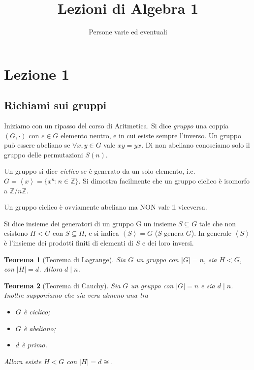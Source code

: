 \documentclass[a4paper,10pt,oneside]{article}
\title{Lezioni di Algebra 1}
\author{Persone varie ed eventuali}
\date{}
\newcommand{\myname}[1]{\emph{#1}}
\newcommand{\abs}[1]{\left|#1\right|} %
\newcommand{\gen}[1]{\left\langle#1\right\rangle} %
\newcommand{\isom}{\cong}
\theoremstyle{plain}
\newtheorem{mytheorem}{Teorema}[section]
\theoremstyle{definition}
\theoremstyle{remark}
\begin{document}
\maketitle

\cleardoublepage	
  \section{Lezione 1}
    \subsection{Richiami sui gruppi}
      Iniziamo con un ripasso del corso di Aritmetica. Si dice \myname{gruppo} una coppia $(G,\cdot)$ con $e \in G$ elemento neutro, e in cui esiste sempre l'inverso. Un gruppo può essere abeliano se $\forall x,y\in G$ vale $xy=yx$. Di non abeliano conosciamo solo il gruppo delle permutazioni $S(n)$.
      
      Un gruppo si dice \myname{ciclico} se è generato da un solo elemento, i.e. $G = \gen x = \{x^n: n\in \mathbb Z\}$. Si dimostra facilmente che un gruppo ciclico è isomorfo a $\mathbb Z/n\mathbb Z$.
      
      Un gruppo ciclico è ovviamente abeliano ma NON vale il viceversa.
      
      Si dice insieme dei generatori di un gruppo G un insieme $S\subseteq G$ tale che non esistono $H<G$ con $S\subseteq H$, e si indica $\gen S =G$ ($S$ genera $G$). In generale $\gen S$ è l'insieme dei prodotti finiti di elementi di $S$ e dei loro inversi.
      
      \begin{mytheorem}[Teorema di Lagrange]
	Sia $G$ un gruppo con $\abs G = n$, sia $H<G$, con $\abs H = d$. Allora $d\mid n$.
      \end{mytheorem}
      
      \begin{mytheorem}[Teorema di Cauchy]
	Sia $G$ un gruppo con $\abs G = n$ e sia $d\mid n$. Inoltre supponiamo che sia vera almeno una tra
	\begin{itemize}
	  \item $G$ è ciclico;
	  \item $G$ è abeliano;
	  \item $d$ è primo.
	\end{itemize}
	
	Allora esiste $H<G$ con $\abs H=d\isom$.
      \end{mytheorem}
      
      
\end{document}
